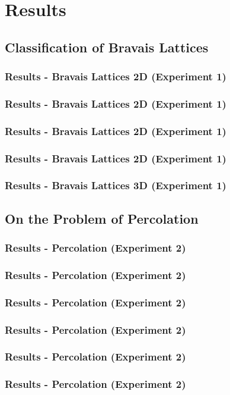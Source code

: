 \documentclass{beamer}
\begin{document}
\section{Results}
\subsection{Classification of Bravais Lattices}
\begin{frame}
    \frametitle{Results - Bravais Lattices 2D (Experiment 1)}
    
\end{frame}
\begin{frame}
    \frametitle{Results - Bravais Lattices 2D (Experiment 1)}
    
\end{frame}
\begin{frame}
    \frametitle{Results - Bravais Lattices 2D (Experiment 1)}
    
\end{frame}
\begin{frame}
    \frametitle{Results - Bravais Lattices 2D (Experiment 1)}
    
\end{frame}
\begin{frame}
    \frametitle{Results - Bravais Lattices 3D (Experiment 1)}
    
\end{frame}
\subsection{On the Problem of Percolation}
\begin{frame}
    \frametitle{Results - Percolation (Experiment 2)}
    
\end{frame}
\begin{frame}
    \frametitle{Results - Percolation (Experiment 2)}
    
\end{frame}
\begin{frame}
    \frametitle{Results - Percolation (Experiment 2)}
    
\end{frame}
\begin{frame}
    \frametitle{Results - Percolation (Experiment 2)}
    
\end{frame}
\begin{frame}
    \frametitle{Results - Percolation (Experiment 2)}
    
\end{frame}
\begin{frame}
    \frametitle{Results - Percolation (Experiment 2)}
    
\end{frame}
\end{document}
